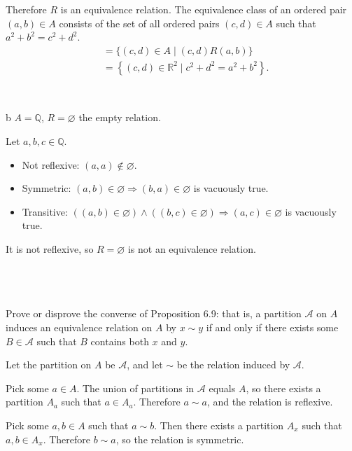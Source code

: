 \documentclass{article}
\begin{document}
Therefore $ R$ is an equivalence relation. The equivalence class of an ordered pair $(a,b) \in A$ consists of the set of all ordered pairs $(c,d)\in A$ such that $a^2+b^2=c^2+d^2$.
\begin{align*}
[(a,b)] & =\{( c,d) \in A\mid ( c,d) R( a,b)\}\\
 & =\left\{( c,d) \in \mathbb{R}^{2} \mid c^{2} +d^{2} =a^{2} +b^{2}\right\} .
\end{align*}

\

\begin{problem} b
$A=\mathbb{Q}$, $R=\varnothing$ the empty relation.
\end{problem}

Let $ a,b,c\in \mathbb{Q}$.
\begin{itemize}
\item Not reflexive: $ ( a,a) \notin \varnothing $.
\item Symmetric: $ ( a,b) \in \varnothing \Rightarrow ( b,a) \in \varnothing $ is vacuously true. 
\item Transitive: $ (( a,b) \in \varnothing ) \land (( b,c) \in \varnothing ) \Rightarrow ( a,c) \in \varnothing $ is vacuously true.
\end{itemize}

It is not reflexive, so $ R=\varnothing $ is not an equivalence relation.

\
\hline
\section{}

\begin{problem*}
Prove or disprove the converse of Proposition 6.9: that is, a partition $\mathcal{A}$ on $A$ induces an equivalence relation on $A$ by $x\sim y$ if and only if there exists some $B\in\mathcal{A}$ such that $B$ contains both $x$ and $y$.
\end{problem*}

Let the partition on $A$ be $\mathcal{A}$, and let $\sim $ be the relation induced by $\mathcal{A}$. 



Pick some $a\in A$. The union of partitions in $\mathcal{A}$ equals $A$, so there exists a partition $A_a$ such that $a \in A_a$. Therefore $a\sim a$, and the relation is reflexive. 



Pick some $a,b\in A$ such that $a\sim b$. Then there exists a partition $A_{x}$ such that $a,b\in A_{x}$. Therefore $b\sim a$, so the relation is symmetric.
\end{document}

